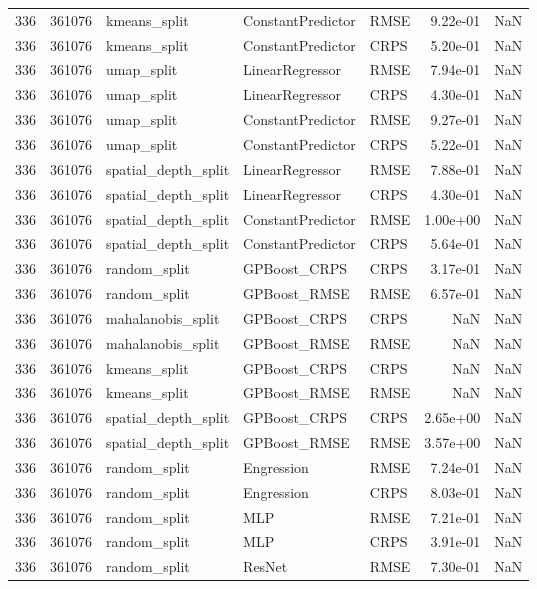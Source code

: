 \begin{tabular}{rrlllrr}
336 & 361076 & kmeans\_split & ConstantPredictor & RMSE & 9.22e-01 & NaN \\
336 & 361076 & kmeans\_split & ConstantPredictor & CRPS & 5.20e-01 & NaN \\
336 & 361076 & umap\_split & LinearRegressor & RMSE & 7.94e-01 & NaN \\
336 & 361076 & umap\_split & LinearRegressor & CRPS & 4.30e-01 & NaN \\
336 & 361076 & umap\_split & ConstantPredictor & RMSE & 9.27e-01 & NaN \\
336 & 361076 & umap\_split & ConstantPredictor & CRPS & 5.22e-01 & NaN \\
336 & 361076 & spatial\_depth\_split & LinearRegressor & RMSE & 7.88e-01 & NaN \\
336 & 361076 & spatial\_depth\_split & LinearRegressor & CRPS & 4.30e-01 & NaN \\
336 & 361076 & spatial\_depth\_split & ConstantPredictor & RMSE & 1.00e+00 & NaN \\
336 & 361076 & spatial\_depth\_split & ConstantPredictor & CRPS & 5.64e-01 & NaN \\
336 & 361076 & random\_split & GPBoost\_CRPS & CRPS & 3.17e-01 & NaN \\
336 & 361076 & random\_split & GPBoost\_RMSE & RMSE & 6.57e-01 & NaN \\
336 & 361076 & mahalanobis\_split & GPBoost\_CRPS & CRPS & NaN & NaN \\
336 & 361076 & mahalanobis\_split & GPBoost\_RMSE & RMSE & NaN & NaN \\
336 & 361076 & kmeans\_split & GPBoost\_CRPS & CRPS & NaN & NaN \\
336 & 361076 & kmeans\_split & GPBoost\_RMSE & RMSE & NaN & NaN \\
336 & 361076 & spatial\_depth\_split & GPBoost\_CRPS & CRPS & 2.65e+00 & NaN \\
336 & 361076 & spatial\_depth\_split & GPBoost\_RMSE & RMSE & 3.57e+00 & NaN \\
336 & 361076 & random\_split & Engression & RMSE & 7.24e-01 & NaN \\
336 & 361076 & random\_split & Engression & CRPS & 8.03e-01 & NaN \\
336 & 361076 & random\_split & MLP & RMSE & 7.21e-01 & NaN \\
336 & 361076 & random\_split & MLP & CRPS & 3.91e-01 & NaN \\
336 & 361076 & random\_split & ResNet & RMSE & 7.30e-01 & NaN \\

\end{tabular}
